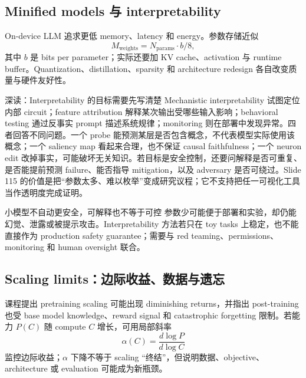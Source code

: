 
\subsection{Minified models 与 interpretability}

On-device LLM 追求更低 memory、latency 和 energy。参数存储近似
\[
M_{\text{weights}}=N_{\text{params}}\cdot b/8,
\]
其中 $b$ 是 bits per parameter；实际还要加 KV cache、activation 与 runtime buffer。Quantization、distillation、sparsity 和 architecture redesign 各自改变质量与硬件友好性。





\begin{knowledgebox}{深读：Interpretability 的目标需要先写清楚}
Mechanistic interpretability 试图定位内部 circuit；feature attribution 解释某次输出受哪些输入影响；behavioral testing 通过反事实 prompt 描述系统规律；monitoring 则在部署中发现异常。四者回答不同问题。一个 probe 能预测某层是否包含概念，不代表模型实际使用该概念；一个 saliency map 看起来合理，也不保证 causal faithfulness；一个 neuron edit 改掉事实，可能破坏无关知识。若目标是安全控制，还要问解释是否可重复、是否能提前预测 failure、能否指导 mitigation，以及 adversary 是否可绕过。Slide 115 的价值是把“参数太多、难以枚举”变成研究议程；它不支持把任一可视化工具当作透明度完成证明。
\end{knowledgebox}

\begin{warningbox}{小模型不自动更安全，可解释也不等于可控}
参数少可能便于部署和实验，却仍能幻觉、泄露或被提示攻击。Interpretability 方法若只在 toy tasks 上稳定，也不能直接作为 production safety guarantee；需要与 red teaming、permissions、monitoring 和 human oversight 联合。
\end{warningbox}

\subsection{Scaling limits：边际收益、数据与遗忘}

课程提出 pretraining scaling 可能出现 diminishing returns，并指出 post-training 也受 base model knowledge、reward signal 和 catastrophic forgetting 限制。若能力 $P(C)$ 随 compute $C$ 增长，可用局部斜率
\[
\alpha(C)=\frac{d\log P}{d\log C}
\]
监控边际收益；$\alpha$ 下降不等于 scaling “终结”，但说明数据、objective、architecture 或 evaluation 可能成为新瓶颈。


